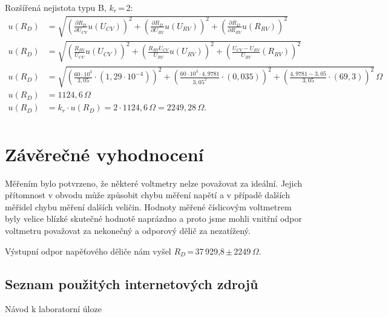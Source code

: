 \documentclass[a4paper,12pt]{article}   %
\newcommand{\rd}{$R_{D}$}
\newcommand{\eucv}{U_{CV}}
\newcommand{\eurv}{U_{RV}}
\newcommand{\errv}{R_{RV}}
\newcommand{\erd}{R_{D}}
\begin{document}
Rozšířená nejistota typu B, $k_r$\,=\,2:
\begin{equation*}
    \begin{split}
        u(\erd)&=\sqrt{\left( \frac{\partial \erd}{\partial\eucv}u(\eucv) \right)^2+\left( \frac{\partial \erd}{\partial\eurv}u(\eurv) \right)^2+\left( \frac{\partial \erd}{\partial\errv}u(\errv) \right)^2}\\
        u(\erd)&=\sqrt{\left( \frac{\errv}{\eucv}u(\eucv) \right)^2+\left( \frac{\errv\eucv}{\eurv}u(\eurv) \right)^2+\left( \frac{\eucv-\eurv}{\eurv}(\errv) \right)^2}\\
        u(\erd)&=\sqrt{\left( \frac{60\cdot10^{3}}{3,05}\cdot(1,29\cdot 10^{-4}) \right)^2+\left( \frac{60\cdot 10^3\cdot 4,9781}{3,05^2}\cdot(0,035) \right)^2+\left( \frac{4,9781-3,05}{3,05}\cdot(69,3) \right)^2}\,\Omega\\
        u(\erd)&=1124,6\,\Omega\\
        u(\erd)&=k_r\cdot u(\erd)=2\cdot 1124,6\,\Omega = 2249,28\,\Omega.\\
    \end{split}
\end{equation*}


\section{Závěrečné vyhodnocení}
Měřením bylo potvrzeno, že některé voltmetry nelze považovat za ideální. Jejich přítomnost v obvodu může způsobit chybu měření napětí a v případě dalších měřidel chybu měření dalších veličin. Hodnoty měřené číslicovým voltmetrem byly velice blízké skutečné hodnotě naprázdno a proto jsme mohli vnitřní odpor voltmetru považovat za nekonečný a odporový dělič za nezatížený.

Výstupní odpor napěťového děliče nám vyšel \rd \,=\,37\,929,8\,$\pm$\,2249\,$\Omega$.





\clearpage
\renewcommand{\refname}{Seznam použité literatury a~zdrojů informací} 

\begin{thebibliography}{99}

\subsection*{Seznam použitých internetových zdrojů}
     Návod k laboratorní úloze
    
\end{thebibliography}
\end{document}
